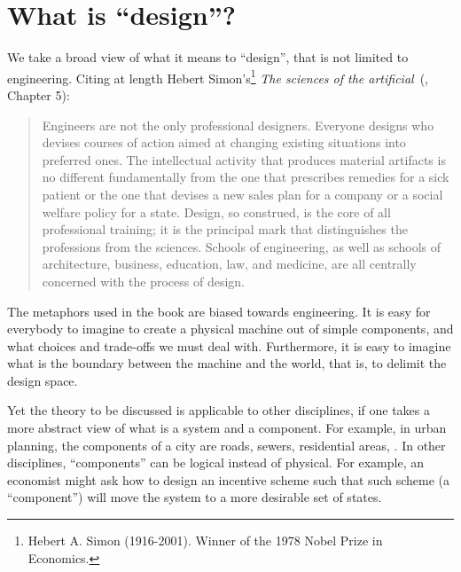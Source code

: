 
\section{What is ``design''?}
\label{sec:design-what-is-design}


We take a broad view of what it means to ``design'', that is not limited to engineering.
Citing at length Hebert Simon's\footnote{Hebert A.
    Simon (1916-2001).
    Winner of the 1978 Nobel Prize in Economics.
}
\emph{The sciences of the artificial}~(\cite{hebert96sciences}, Chapter 5):

\begin{quote}
    Engineers are not the only professional designers.
    Everyone designs who devises courses of action aimed at changing existing situations into preferred ones.
    The intellectual activity that produces material artifacts is no different fundamentally from the one that prescribes remedies for a sick patient or the one that devises a new sales plan for a company or a social welfare policy for a state.
    Design, so construed, is the core of all professional training;
    it is the principal mark that distinguishes the professions from the sciences.
    Schools of engineering, as well as schools of architecture, business, education, law, and medicine, are all centrally concerned with the process of design.
\end{quote}

The metaphors used in the book are biased towards engineering.
It is easy for everybody to imagine to create a physical machine out of simple components, and what choices and trade-offs we must deal with.
Furthermore, it is easy to imagine what is the boundary between the machine and the world, that is, to delimit the design space.

Yet the theory to be discussed is applicable to other disciplines, if one takes a more abstract view of what is a system and a component.
For example, in urban planning, the components of a city are roads, sewers, residential areas, \etc.
In other disciplines, ``components'' can be logical instead of physical.
For example, an economist might ask how to design an incentive scheme such that such scheme (a ``component'') will move the system to a more desirable set of states.
